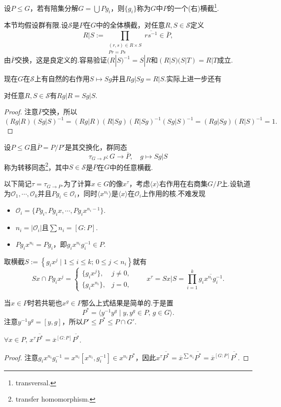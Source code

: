 \medskip 设$P\le G$，若有陪集分解$G=\bigcup Pg_i$，则$\{g_i\}$称为$G$中$P$的一个(右){\heiti 横截}\footnote{transversal.}.

{\heiti 本节均假设群有限}.设$\mathcal{S}$是$P$在$G$中的全体横截，对任意$R,S\in\mathcal{S}$定义
\[
	R|S:=\prod_{\substack{(r,s)\in R\times S\\ Pr=Ps}}\overline{rs^{-1}}\in\overline{P},
\]
由$\overline{P}$交换，这是良定义的.容易验证$(R|S)^{-1}=S|R$和$(R|S)(S|T)=R|T$成立.

现在$G$在$\mathcal{S}$上有自然的右作用$S\mapsto Sg$并且$Rg|Sg=R|S$.实际上进一步还有
\begin{lemma}
	对任意$R,S\in\mathcal{S}$有$Rg|R=Sg|S$.
\end{lemma}
\begin{proof}
	注意$\overline{P}$交换，所以
	\[
		(Rg|R)(Sg|S)^{-1}=(Rg|R)(R|Sg)(R|Sg)^{-1}(Sg|S)^{-1}=(Rg|Sg)(R|S)^{-1}=1.
	\]
\end{proof}
\begin{definition}
	设$P\le G$且$\overline{P}=P/P'$是其交换化，群同态
	\[
		\tau_{G\to P}\colon G\to\overline{P},\quad g\mapsto Sg|S
	\]
	称为{\heiti 转移同态}\footnote{transfer homomorphism.}，其中$S\in\mathcal{S}$是$P$在$G$中的任意横截.
\end{definition}

以下简记$\tau=\tau_{G\to P}$.为了计算$x\in G$的像$x^\tau$，考虑$\langle x\rangle $右作用在右商集$G/P$上.设轨道为$\mathcal{O}_1,\cdots,\mathcal{O}_k$并且$Pg_i\in\mathcal{O}_i$，同时$\langle x^{n_i}\rangle $是$\langle x\rangle $在$\mathcal{O}_i$上作用的核.不难发现
\begin{itemize}
	\item $\mathcal{O}_i=\{Pg_i,Pg_ix,\cdots,Pg_ix^{n_i-1}\}$.
	\item $n_i=|\mathcal{O}_i|$且$\sum n_i=[G:P]$.
	\item $Pg_ix^{n_i}=Pg_i$，即$g_ix^{n_i}g_i^{-1}\in P$.
\end{itemize}

取横截$S:=\left\{g_ix^j\mid 1\le i\le k;\,0\le j<n_i\right\}$就有
\[
	Sx\cap Pg_ix^j=\begin{cases}
		\{g_ix^j\},&j\ne 0,\\
		\{g_ix^{n_i}\},&j=0,
	\end{cases}\qquad x^\tau=Sx|S=\prod_{i=1}^k\overline{g_ix^{n_i}g_i^{-1}}.
\]

当$x\in P$时若共轭也$x^g\in P$那么上式结果是简单的.于是置
\[
	P^*=\langle y^{-1}y^g\mid y,y^g\in P,\,g\in G\rangle.
\]
注意$y^{-1}y^g=[y,g]$，所以$P'\le P^*\le P\cap G'$.
\begin{lemma*}
	$\forall x\in P,\,x^\tau\overline{P^*}=\overline{x}^{[G:P]}\overline{P^*}$.
\end{lemma*}
\begin{proof}
	注意$g_ix^{n_i}g_i^{-1}=x^{n_i}[x^{n_i},g_i^{-1}]\in x^{n_i}P^*$，因此$x^\tau\overline{P^*}=\overline{x}^{\sum n_i}\overline{P^*}=\overline{x}^{[G:P]}\overline{P^*}$.
\end{proof}

